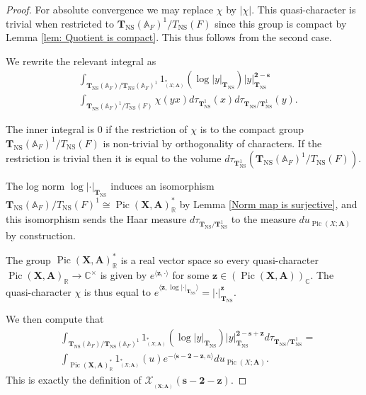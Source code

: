 \documentclass[a4paper,11pt,reqno]{amsart}
\newcommand{\R}{\mathbb{R}}
\newcommand{\C}{\mathbb{C}}
\newcommand{\A}{\mathbb{A}}
\DeclareMathOperator{\Pic}{Pic}
\DeclareMathOperator{\NS}{NS}
\DeclareMathOperator{\Eff}{\overline{Eff}}
\theoremstyle{definition}
\begin{document}
\begin{proof}
	For absolute convergence we may replace $\chi$ by $|\chi|$. This quasi-character is trivial when restricted to $\mathbf{T}_{\NS}(\A_F)^1/T_{\NS}(F)$ since this group is compact by Lemma \ref{lem: Quotient is compact}. This thus follows from the second case.
	
	We rewrite the relevant integral as
	\begin{equation*}
		\begin{split}
		&\int_{\mathbf{T}_{\NS}(\A_F)/\mathbf{T}_{\NS}(\A_F)^1} {1}_{\Eff_{(X; \mathbf{A})}^*}(\log |y|_{\mathbf{T}_{\NS}}) |y|_{\mathbf{T}_{\NS}}^{\mathbf{2} - \bm{s}} \\ &\int_{\mathbf{T}_{\NS}(\A_F)^1/ T_{\NS}(F)} \chi(y x) d\tau_{\mathbf{T}_{\NS}^1}(x) d \tau_{\mathbf{T}_{\NS}/\mathbf{T}^1_{\NS}}(y).
				\end{split}
	\end{equation*}
	
	The inner integral is $0$ if the restriction of $\chi$ is to the compact group $\mathbf{T}_{\NS}(\A_F)^1/T_{\NS}(F)$ is non-trivial by orthogonality of characters. If the restriction is trivial then it is equal to the volume $d\tau_{\mathbf{T}_{\NS}^1}(\mathbf{T}_{\NS}(\A_F)^1/T_{\NS}(F))$. 
	
	The log norm $\log | \cdot |_{\mathbf{T}_{\NS}}$ induces an isomorphism $\mathbf{T}_{\NS}(\A_F)/T_{\NS}(F)^1 \cong \Pic (\mathbf{X}, \mathbf{A})^{*}_{\R}$ by Lemma \ref{Norm map is surjective}, and this isomorphism sends the Haar measure $d \tau_{\mathbf{T}_{\NS}/\mathbf{T}^1_{\NS}}$ to the measure $du_{\Pic(X ; \mathbf{A})}$ by construction.
	
	The group $\Pic(\mathbf{X}, \mathbf{A})^{*}_{\R}$ is a real vector space so every quasi-character $\Pic (\mathbf{X}, \mathbf{A})_{\R} \to \C^{\times}$ is given by $e^{\langle\bm{z}, \cdot \rangle}$ for some $\bm{z} \in (\Pic (\mathbf{X}, \mathbf{A}))_{\C}$. The quasi-character $\chi$ is thus equal to $e^{\langle\bm{z}, \log | \cdot |_{\mathbf{T}_{\NS}} \rangle} = | \cdot |_{\mathbf{T}_{\NS}}^{\bm{z}}$.
	
	We then compute that
	\begin{equation*}
		\begin{split}
			&	\int_{\mathbf{T}_{\NS}(\A_F)/\mathbf{T}_{\NS}(\A_F)^1} {1}_{\Eff_{(X; \mathbf{A})}^*}(\log |y|_{\mathbf{T}_{\NS}}) |y|_{\mathbf{T}_{\NS}}^{\mathbf{2} - \bm{s} + \bm{z}} d \tau_{\mathbf{T}_{\NS}/\mathbf{T}^1_{\NS}} = \\
			&\int_{\Pic (\mathbf{X}, \mathbf{A})^{*}_{\R}} {1}_{\Eff_{(X; \mathbf{A})}^*}(u) e^{- \langle \bm{s} - \mathbf{2} - \mathbf{z}, u \rangle} du_{\Pic(X ; \mathbf{A})}.
		\end{split}
	\end{equation*}
	This is exactly the definition of $\mathcal{X}_{\Eff_{(\mathbf{X}; \mathbf{A})}}(\bm{s} - \bm{2} - \bm{z})$.
\end{proof}
\end{document}
